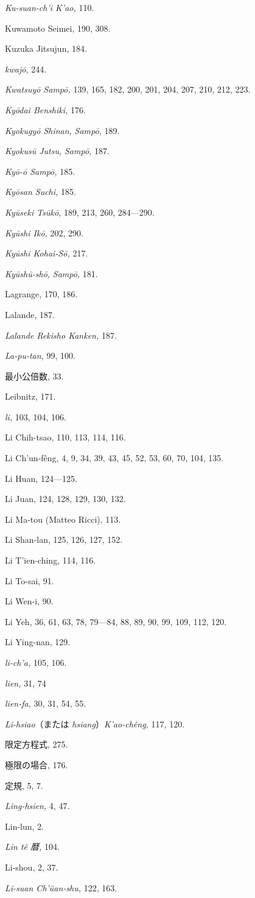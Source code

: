 \documentclass[11pt]{article}
\begin{document}
\emph{Ku-suan-ch'i K'ao,} 110.\par
Kuwamoto Seimei, 190, 308.\par
Kuzuka Jitsujun, 184.\par
\emph{kwajō,} 244.\par
\emph{Kwatsuyō Sampō,} 139, 165, 182, 200, 201, 204, 207, 210, 212, 223.\par
\emph{Kyōdai Benshiki,} 176.\par
\emph{Kyokugyō Shinan,} \emph{Sampō,} 189.\par
\emph{Kyokusū Jutsu,} \emph{Sampō,} 187.\par
\emph{Kyō-ō Sampō,} 185.\par
\emph{Kyōsan Suchi,} 185.\par
\emph{Kyūseki Tsūkō,} 189, 213, 260, 284---290.\par
\emph{Kyūshi Ikō,} 202, 290.\par
\emph{Kyūshi Kohai-Sō,} 217.\par
\emph{Kyūshū-shō,} \emph{Sampō,} 181.\par
\medskip
Lagrange, 170, 186.\par
Lalande, 187.\par
\emph{Lalande Rekisho Kanken,} 187.\par
\emph{La-pu-tan,} 99, 100.\par
最小公倍数, 33.\par
Leibnitz, 171.\par
\emph{li,} 103, 104, 106.\par
Li Chih-tsao, 110, 113, 114, 116.\par
Li Ch'un-fêng, 4, 9, 34, 39, 43, 45, 52, 53, 60, 70, 104, 135.\par
Li Huan, 124---125.\par
Li Juan, 124, 128, 129, 130, 132.\par
Li Ma-tou (Matteo Ricci), 113.\par
Li Shan-lan, 125, 126, 127, 152.\par
Li T'ien-ching, 114, 116.\par
Li To-sai, 91.\par
Li Wen-i, 90.\par
Li Yeh, 36, 61, 63, 78, 79---84, 88, 89, 90, 99, 109, 112, 120.\par
Li Ying-nan, 129.\par
\emph{li-ch'a,} 105, 106.\par
\emph{lien,} 31, 74\par
\emph{lien-fa,} 30, 31, 54, 55.\par
\emph{Li-hsiao}（または \emph{hsiang}）\emph{K'ao-chêng,} 117, 120.\par
限定方程式, 275.\par
極限の場合, 176.\par
定規, 5, 7.\par
\emph{Ling-hsien,} 4, 47.\par
Lin-lun, 2.\par
\emph{Lin tê 暦,} 104.\par
Li-shou, 2, 37.\par
\emph{Li-suan Ch'üan-shu,} 122, 163.\par
\end{document}
